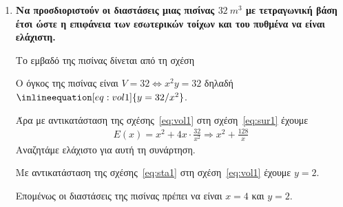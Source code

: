 



\pagestyle{askhseis}
\everymath{\displaystyle}



\begin{center}
  \minibox{\large \bfseries \textcolor{Col1}{Προβλήματα Ακροτάτων}}
\end{center}

\vspace{\baselineskip}

\begin{enumerate}

  \item {\bfseries \boldmath Να προσδιοριστούν οι διαστάσεις μιας πισίνας 
      $ \SI{32}{m^{3}} $ με τετραγωνική βάση έτσι ώστε η επιφάνεια των εσωτερικών 
    τοίχων και του πυθμένα να είναι ελάχιστη.}
    \begin{solution}
      Το εμβαδό της πισίνας δίνεται από τη σχέση

      Ο όγκος της πισίνας είναι $V = 32 \Leftrightarrow  x^{2}y = 32$
      δηλαδή $\inlineequation[eq:vol1]{y = {32}/{x^{2}}}$.

      Άρα με αντικατάσταση της σχέσης~\eqref{eq:vol1} στη
      σχέση~\eqref{eq:sur1} έχουμε
      \begin{align*}
        E(x) = x^{2} + 4x\cdot \frac{32}{x^{2}} \Rightarrow x^{2} +	\frac{128}{x}
      \end{align*}
      Αναζητάμε ελάχιστο για αυτή τη συνάρτηση.
      Με αντικατάσταση της σχέσης~\eqref{eq:sta1} στη σχέση~\eqref{eq:vol1} έχουμε 
      $ y = 2 $.

      Επομένως οι διαστάσεις της πισίνας πρέπει να είναι $ x = 4 $ και $ y = 2 $.
    \end{solution}


\end{enumerate}
